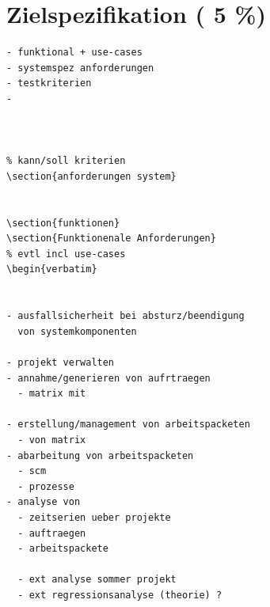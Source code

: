 \chapter{Zielspezifikation ( 5 \%)}












\begin{verbatim}
- funktional + use-cases
- systemspez anforderungen
- testkriterien
-



% kann/soll kriterien
\section{anforderungen system}


\section{funktionen}
\section{Funktionenale Anforderungen}
% evtl incl use-cases
\begin{verbatim}


- ausfallsicherheit bei absturz/beendigung
  von systemkomponenten

- projekt verwalten
- annahme/generieren von aufrtraegen
  - matrix mit

- erstellung/management von arbeitspacketen
  - von matrix
- abarbeitung von arbeitspacketen
  - scm
  - prozesse
- analyse von
  - zeitserien ueber projekte
  - auftraegen
  - arbeitspackete

  - ext analyse sommer projekt
  - ext regressionsanalyse (theorie) ?
\end{verbatim}

